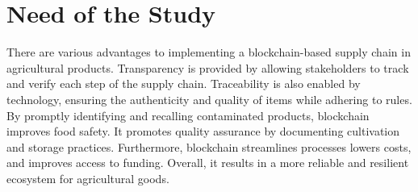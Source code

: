 
\section{Need of the Study}
There are various advantages to implementing a blockchain-based supply chain in agricultural products. Transparency is provided 
by allowing stakeholders to track and verify each step of the supply chain. Traceability is also enabled by technology, ensuring the 
authenticity and quality of items while adhering to rules. By promptly identifying and recalling contaminated products, blockchain 
improves food safety. It promotes quality assurance by documenting cultivation and storage practices. Furthermore, blockchain 
streamlines processes lowers costs, and improves access to funding. Overall, it results in a more reliable and resilient 
ecosystem for agricultural goods.






  



